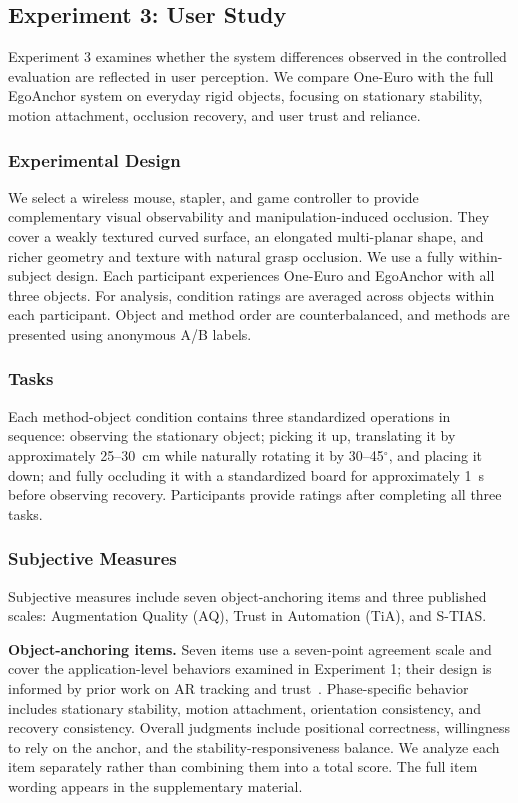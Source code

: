 \documentclass[review]{vgtc}
\begin{document}
\subsection{Experiment 3: User Study}\label{sec:exp3-design}

Experiment 3 examines whether the system differences observed in the controlled evaluation are reflected in user perception. We compare One-Euro with the full EgoAnchor system on everyday rigid objects, focusing on stationary stability, motion attachment, occlusion recovery, and user trust and reliance.

\subsubsection{Experimental Design}

We select a wireless mouse, stapler, and game controller to provide complementary visual observability and manipulation-induced occlusion. They cover a weakly textured curved surface, an elongated multi-planar shape, and richer geometry and texture with natural grasp occlusion. We use a fully within-subject design. Each participant experiences One-Euro and EgoAnchor with all three objects. For analysis, condition ratings are averaged across objects within each participant. Object and method order are counterbalanced, and methods are presented using anonymous A/B labels.

\subsubsection{Tasks}

Each method-object condition contains three standardized operations in sequence: observing the stationary object; picking it up, translating it by approximately 25--30~cm while naturally rotating it by 30--45$^\circ$, and placing it down; and fully occluding it with a standardized board for approximately 1~s before observing recovery. Participants provide ratings after completing all three tasks.

\subsubsection{Subjective Measures}

Subjective measures include seven object-anchoring items and three published scales: Augmentation Quality (AQ), Trust in Automation (TiA), and S-TIAS.

\textbf{Object-anchoring items.}
Seven items use a seven-point agreement scale and cover the application-level behaviors examined in Experiment 1; their design is informed by prior work on AR tracking and trust~\cite{trustar2024}. Phase-specific behavior includes stationary stability, motion attachment, orientation consistency, and recovery consistency. Overall judgments include positional correctness, willingness to rely on the anchor, and the stability-responsiveness balance. We analyze each item separately rather than combining them into a total score. The full item wording appears in the supplementary material.
\end{document}
